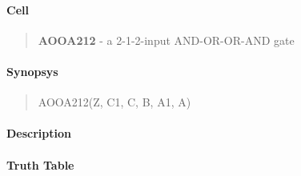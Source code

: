 \label{AOOA212}
\paragraph{Cell}
\begin{quote}
    \textbf{AOOA212} - a 2-1-2-input AND-OR-OR-AND gate
\end{quote}

\paragraph{Synopsys}
\begin{quote}
    AOOA212(Z, C1, C, B, A1, A)
\end{quote}

\paragraph{Description}

%

\paragraph{Truth Table}
%

